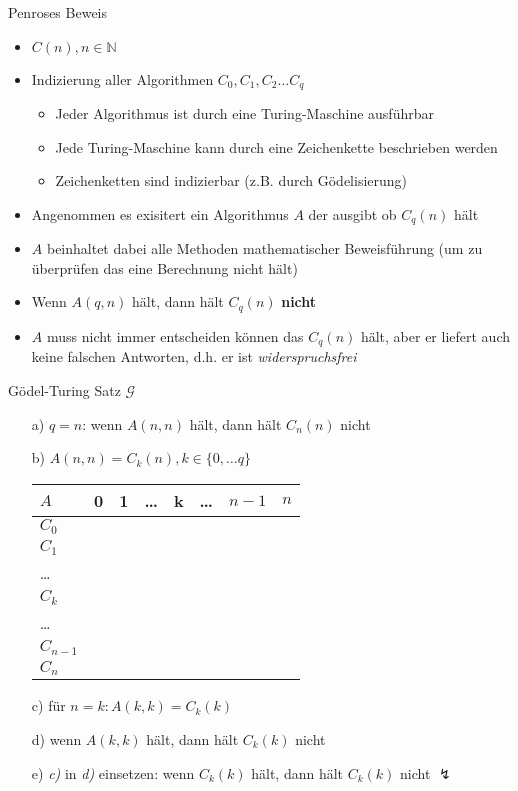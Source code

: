 \begin{frame}{Penroses Beweis}
    \begin{itemize}
        \item $C(n), n \in \mathbb{N}$
        \item Indizierung aller Algorithmen $C_0, C_1, C_2 \ldots C_q$
        \begin{itemize}
            \item Jeder Algorithmus ist durch eine Turing-Maschine ausführbar
            \item Jede Turing-Maschine kann durch eine Zeichenkette beschrieben werden
            \item Zeichenketten sind indizierbar (z.B. durch Gödelisierung)
        \end{itemize}
        \item Angenommen es exisitert ein Algorithmus $A$ der ausgibt ob $C_q(n)$ hält
        \item $A$ beinhaltet dabei alle Methoden mathematischer Beweisführung (um zu überprüfen das eine Berechnung nicht hält)
        \item Wenn $A(q,n)$ hält, dann hält $C_q(n)$ \textbf{nicht}
        \item $A$ muss nicht immer entscheiden können das $C_q(n)$ hält, aber er liefert auch keine falschen Antworten, d.h. er ist \emph{widerspruchsfrei}
    \end{itemize}
\end{frame}

\begin{frame}{Gödel-Turing Satz $\mathscr{G}$}
    \begin{itemize}
        \item[a)] $q=n$: wenn $A(n,n)$ hält, dann hält $C_n(n)$ nicht %
        \item[b)] $A(n,n)=C_k(n), k \in \{0, \ldots q\}$\\
\vspace{3mm}
\begin{tabular}{l|p{8mm}p{8mm}p{8mm}p{8mm}p{8mm}p{8mm}p{8mm}}
$A$     & 0 & 1 & \ldots & k & \dots & $n-1$ & $n$\\
\hline
$C_0$   & \cellcolor{sunset} & & & & & & \\
$C_1$   & & \cellcolor{sunset} & & & & & \\
\ldots  & & & \cellcolor{sunset} & & & & \\
\rowcolor{sunset}
$C_k$   & & & & \cellcolor{purple} & & & \\
\ldots  & & & & & \cellcolor{sunset} & & \\
$C_{n-1}$ & & & & & & \cellcolor{sunset} & \\
$C_n$   & & & & & & & \cellcolor{sunset}
\end{tabular}
\vspace{3mm}
        \item[c)] für $n=k: A(k,k) = C_k(k)$
        \item[d)] wenn $A(k,k)$ hält, dann hält $C_k(k)$ nicht
        \item[e)] \emph{c)} in \emph{d)} einsetzen: wenn $C_k(k)$ hält, dann hält $C_k(k)$ nicht $\lightning$
    \end{itemize}
\end{frame}

